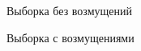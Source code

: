\begin{figure}
\caption{Выборка без возмущений}
\label{fig:box20}
\end{figure}

\begin{figure}[h]
\caption{Выборка с возмущениями}
\label{fig:box20}
\end{figure}
